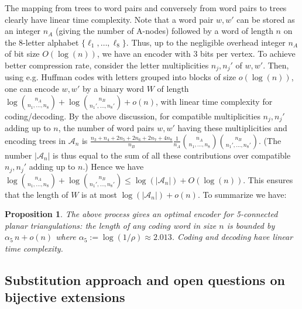 \documentclass[letter]{amsart}
\numberwithin{theo}{section}
\newtheorem{prop}[theo]{Proposition}
\theoremstyle{remark}
\def\cA{\mathcal{A}}
\begin{document}
The mapping from trees to word pairs and conversely from word pairs to trees clearly have linear time complexity. Note that a word pair $w,w'$ can be stored as an integer $n_A$ (giving the number of A-nodes) followed by a word of length $n$ on the $8$-letter alphabet $\{\ell_1,\ldots,\ell_8\}$. Thus, up to the negligible overhead integer $n_A$ of bit size $O(\log(n))$, we have an encoder with 3 bits per vertex. To achieve better compression rate, consider the letter multiplicities $n_j,n_j'$ of $w,w'$. Then, using e.g. Huffman codes with letters grouped into blocks of size $o(\log(n))$, one can encode $w,w'$ by a binary  word $W$ of length $\log\binom{n_A}{n_1,\ldots,n_8}+\log\binom{n_B}{n_1',\ldots,n_8'}+o(n)$, with linear time complexity for coding/decoding. By the above discussion, for compatible multiplicities $n_j,n_j'$ adding up to $n$, 
the number of word pairs $w,w'$ having these multiplicities and encoding trees in $\cA_n$ is   $\frac{n_3+n_4+2n_5+2n_6+2n_7+4n_8}{n_B}\frac1{n_A}\binom{n_A}{n_1,\ldots,n_8}\binom{n_B}{n_1',\ldots,n_8'}$. (The number $|\cA_n|$ is thus equal to the sum of all these contributions over compatible $n_j,n_j'$ adding up to $n$.)  
Hence we have 
$\log\binom{n_A}{n_1,\ldots,n_8}+\log\binom{n_B}{n_1',\ldots,n_8'}\leq \log(|\cA_n|)+O(\log(n))$. This ensures that the length of $W$ is at most $\log(|\cA_n|)+o(n)$. To summarize we have:

\begin{prop}
The above process gives an optimal encoder for 5-connected planar triangulations: the length of any coding word in size $n$ is bounded by $\alpha_5\,n+o(n)$ where $\alpha_5:=\log(1/\rho)\approx 2.013$.  
Coding and decoding have linear time complexity. 
\end{prop}



\subsection{Substitution approach and open questions on bijective extensions}
\end{document}
